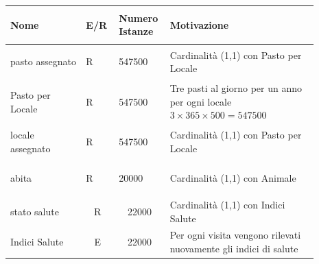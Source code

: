 \documentclass[12pt,a4paper]{article}
\begin{document}
\begin{center}\setlength{\extrarowheight}{1.5pt}\begin{longtable}{|p{0.23\linewidth}|p{0.1\linewidth}|p{0.11\linewidth}|p{0.45\linewidth}|}
\hline \textbf{Nome}   & \begin{center}\vspace{-15pt}\textbf{E/R}\end{center} & \textbf{Numero Istanze} & \textbf{Motivazione}\\ 
\hline
pasto assegnato 				& \begin{center}
\vspace{-25pt}R
\end{center}
					& \begin{center}
					\vspace{-25pt}547500\end{center}
					&  Cardinalità (1,1) con Pasto per Locale \\ 

\hline
Pasto per Locale 				& \begin{center}
\vspace{-25pt}R
\end{center}
					& \begin{center}
					\vspace{-25pt}547500\end{center}
					&  Tre pasti al giorno per un anno per ogni locale $3\times365\times500=547500$ \\ 

\hline
locale assegnato 				& \begin{center}
\vspace{-25pt}R
\end{center}
					& \begin{center}
					\vspace{-25pt}547500\end{center}
					&  Cardinalità (1,1) con Pasto per Locale \\ 

\hline
abita 				& \begin{center}
\vspace{-25pt}R
\end{center}
					& \begin{center}
					\vspace{-25pt}20000\end{center}
					&  Cardinalità (1,1) con Animale \\ 

\hline
stato salute
 & 
\multicolumn{1}{|c|}{R}
 & 
\multicolumn{1}{|c|}{22000}
 & 
Cardinalità (1,1) con Indici Salute
\\
\hline
Indici Salute
 & 
\multicolumn{1}{|c|}{E}
 & 
\multicolumn{1}{|c|}{22000}
 & 
Per ogni visita vengono rilevati nuovamente gli indici di salute
\\
\hline
\end{longtable}\end{center}
\pagebreak
\end{document}

